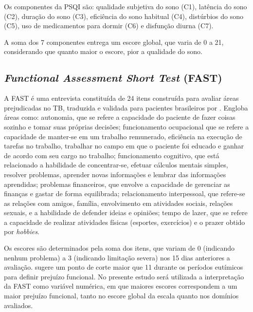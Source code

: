 \documentclass[chapter=TITLE,
               oneside,
               12pt,
               a4paper,
               english,
               brazil]{abntex2}    %
\begin{document}
            Os componentes da PSQI são: qualidade subjetiva do sono (C1),
            latência do sono (C2), duração do sono (C3),
            eficiência do sono habitual (C4), distúrbios do sono (C5),
            uso de medicamentos para dormir (C6) e disfunção diurna (C7).
    
            A soma dos 7 componentes entrega um escore global, que varia de 0 a 21,
            considerando que quanto maior o escore, pior a qualidade do sono.
    
        \subsection{\textit{Functional Assessment Short Test} (FAST)}
        \label{sec:fast}
    
            A FAST é uma entrevista constituída de 24 itens construída para avaliar
            áreas prejudicadas no TB, traduzida e validada para pacientes brasileiros
            por \textcite{cacilhas_validity_2009}.
            Engloba áreas como: autonomia, que se refere a capacidade do paciente de
            fazer coisas sozinho e tomar suas próprias decisões; funcionamento
            ocupacional que se refere a capacidade de manter-se em um trabalho
            remunerado, eficiência na execução de tarefas no trabalho, trabalhar
            no campo em que o paciente foi educado e ganhar de acordo com seu cargo
            no trabalho; funcionamento cognitivo, que está relacionado a habilidade
            de concentrar-se, efetuar cálculos mentais simples, resolver problemas,
            aprender novas informações e lembrar das informações aprendidas; problemas
            financeiros, que envolve a capacidade de gerenciar as finanças e gastar de
            forma equilibrada; relacionamento interpessoal, que refere-se as relações
            com amigos, família, envolvimento em atividades sociais, relações sexuais,
            e a habilidade de defender ideias e opiniões; tempo de lazer, que se refere
            a capacidade de realizar atividades físicas (esportes, exercícios) e o prazer
            obtido por \textit{hobbies}.
    
            Os escores são determinados pela soma dos itens, que variam de
            0 (indicando nenhum problema) a 3 (indicando limitação severa)
            nos 15 dias anteriores a avaliação.
            \textcite{rosa_validity_2007} sugere um ponto de corte maior
            que 11 durante os períodos eutímicos para definir prejuízo
            funcional. No presente estudo será utilizada a interpretação
            da FAST como variável numérica, em que maiores escores correspondem
            a um maior prejuízo funcional, tanto no escore global da escala
            quanto nos domínios avaliados.
    
\end{document}
